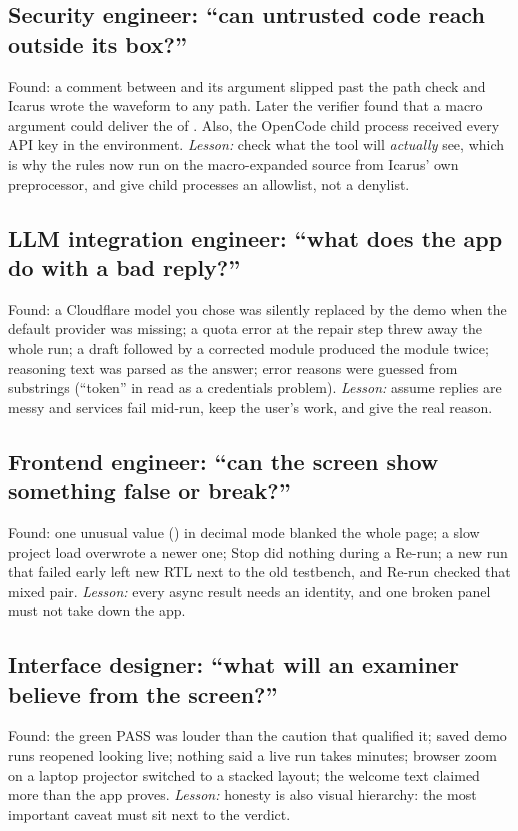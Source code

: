 \subsection*{Security engineer: ``can untrusted code reach outside its box?''}
Found: a comment between  and its argument slipped past the path check and Icarus wrote the waveform to any path. Later the verifier found that a macro argument could deliver the \code{$} of . Also, the OpenCode child process received every API key in the environment. \emph{Lesson:} check what the tool will \emph{actually} see, which is why the rules now run on the macro-expanded source from Icarus' own preprocessor, and give child processes an allowlist, not a denylist.

\subsection*{LLM integration engineer: ``what does the app do with a bad reply?''}
Found: a Cloudflare model you chose was silently replaced by the demo when the default provider was missing; a quota error at the repair step threw away the whole run; a draft followed by a corrected module produced the module twice; reasoning text was parsed as the answer; error reasons were guessed from substrings (``token'' in  read as a credentials problem). \emph{Lesson:} assume replies are messy and services fail mid-run, keep the user's work, and give the real reason.

\subsection*{Frontend engineer: ``can the screen show something false or break?''}
Found: one unusual value () in decimal mode blanked the whole page; a slow project load overwrote a newer one; Stop did nothing during a Re-run; a new run that failed early left new RTL next to the old testbench, and Re-run checked that mixed pair. \emph{Lesson:} every async result needs an identity, and one broken panel must not take down the app.

\subsection*{Interface designer: ``what will an examiner believe from the screen?''}
Found: the green PASS was louder than the caution that qualified it; saved demo runs reopened looking live; nothing said a live run takes minutes; browser zoom on a laptop projector switched to a stacked layout; the welcome text claimed more than the app proves. \emph{Lesson:} honesty is also visual hierarchy: the most important caveat must sit next to the verdict.

